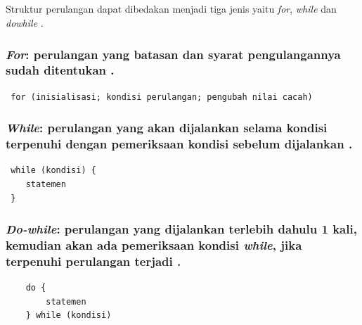 \documentclass[../main.tex]{subfiles}
\begin{document}
    \subsection{{\Looping}}
    Struktur perulangan dapat dibedakan menjadi tiga jenis yaitu \textit{for}, \textit{while} dan \textit{dowhile} \parencite{anam2021cara}.

    \subsubsection{\textit{For}: perulangan yang batasan dan syarat pengulangannya sudah ditentukan \parencite{suryadi2018belajar}.}
\begin{indentlevel0}
\begin{lstlisting}
 for (inisialisasi; kondisi perulangan; pengubah nilai cacah)
\end{lstlisting}
\end{indentlevel0}
    \subsubsection{\textit{While}: perulangan yang akan dijalankan selama kondisi terpenuhi dengan pemeriksaan kondisi sebelum dijalankan \parencite{anam2021cara}.}
\begin{indentlevel0}
\begin{lstlisting}
 while (kondisi) {
    statemen
 }
\end{lstlisting}
\end{indentlevel0}
    \subsubsection{\textit{Do-while}: perulangan yang dijalankan terlebih dahulu 1 kali, kemudian akan ada pemeriksaan kondisi \textit{while}, jika terpenuhi perulangan terjadi \parencite{anam2021cara}.}
\begin{indentlevel0}
\begin{lstlisting}
    do {
        statemen
    } while (kondisi)
\end{lstlisting}
\end{indentlevel0}
\end{document}
